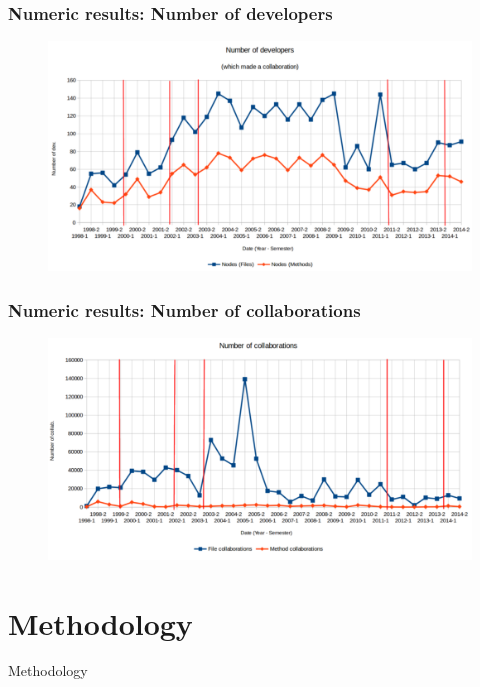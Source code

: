 \documentclass{beamer}
\begin{document}
\begin{frame}
\frametitle{Numeric results: Number of developers}
\begin{figure}
\includegraphics[scale=0.32]{chart1.png}
\label{fig:chartdev1}
\end{figure}
\end{frame}

\begin{frame}
\frametitle{Numeric results: Number of collaborations}
\begin{figure}
\includegraphics[scale=0.32]{chart2.png}
\label{fig:chartdev2}
\end{figure}
\end{frame}

\section{Methodology}
\begin{frame}
\Huge{\centerline{Methodology}}
\end{frame}
\end{document}
